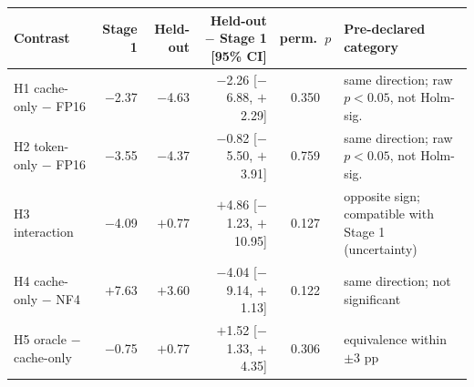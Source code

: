 \begin{tabular}{lrrrcp{3.3cm}}
\toprule
Contrast & Stage 1 & Held-out & Held-out $-$ Stage 1 [95\% CI] & perm.\ $p$ & Pre-declared category \\
\midrule
H1 cache-only $-$ FP16 & $-$2.37 & $-$4.63 & $-$2.26 [$-$6.88, $+$2.29] & 0.350 & same direction; raw $p<0.05$, not Holm-sig. \\
H2 token-only $-$ FP16 & $-$3.55 & $-$4.37 & $-$0.82 [$-$5.50, $+$3.91] & 0.759 & same direction; raw $p<0.05$, not Holm-sig. \\
H3 interaction & $-$4.09 & $+$0.77 & $+$4.86 [$-$1.23, $+$10.95] & 0.127 & opposite sign; compatible with Stage 1 (uncertainty) \\
H4 cache-only $-$ NF4 & $+$7.63 & $+$3.60 & $-$4.04 [$-$9.14, $+$1.13] & 0.122 & same direction; not significant \\
H5 oracle $-$ cache-only & $-$0.75 & $+$0.77 & $+$1.52 [$-$1.33, $+$4.35] & 0.306 & equivalence within $\pm$3 pp \\
\bottomrule
\end{tabular}
